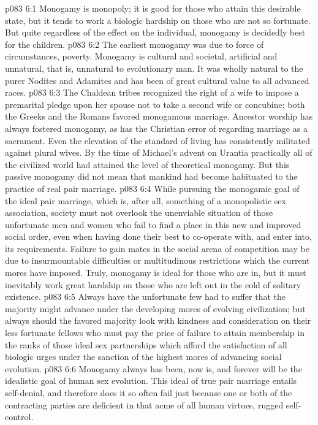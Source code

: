 \vs p083 6:1 Monogamy is monopoly; it is good for those who attain this desirable state, but it tends to work a biologic hardship on those who are not so fortunate. But quite regardless of the effect on the individual, monogamy is decidedly best for the children.
\vs p083 6:2 The earliest monogamy was due to force of circumstances, poverty. Monogamy is cultural and societal, artificial and unnatural, that is, unnatural to evolutionary man. It was wholly natural to the purer Nodites and Adamites and has been of great cultural value to all advanced races.
\vs p083 6:3 The Chaldean tribes recognized the right of a wife to impose a premarital pledge upon her spouse not to take a second wife or concubine; both the Greeks and the Romans favored monogamous marriage. Ancestor worship has always fostered monogamy, as has the Christian error of regarding marriage as a sacrament. Even the elevation of the standard of living has consistently militated against plural wives. By the time of Michael’s advent on Urantia practically all of the civilized world had attained the level of theoretical monogamy. But this passive monogamy did not mean that mankind had become habituated to the practice of real pair marriage.
\vs p083 6:4 \pc While pursuing the monogamic goal of the ideal pair marriage, which is, after all, something of a monopolistic sex association, society must not overlook the unenviable situation of those unfortunate men and women who fail to find a place in this new and improved social order, even when having done their best to co\hyp{}operate with, and enter into, its requirements. Failure to gain mates in the social arena of competition may be due to insurmountable difficulties or multitudinous restrictions which the current mores have imposed. Truly, monogamy is ideal for those who are in, but it must inevitably work great hardship on those who are left out in the cold of solitary existence.
\vs p083 6:5 Always have the unfortunate few had to suffer that the majority might advance under the developing mores of evolving civilization; but always should the favored majority look with kindness and consideration on their less fortunate fellows who must pay the price of failure to attain membership in the ranks of those ideal sex partnerships which afford the satisfaction of all biologic urges under the sanction of the highest mores of advancing social evolution.
\vs p083 6:6 \pc Monogamy always has been, now is, and forever will be the idealistic goal of human sex evolution. This ideal of true pair marriage entails self\hyp{}denial, and therefore does it so often fail just because one or both of the contracting parties are deficient in that acme of all human virtues, rugged self\hyp{}control.
